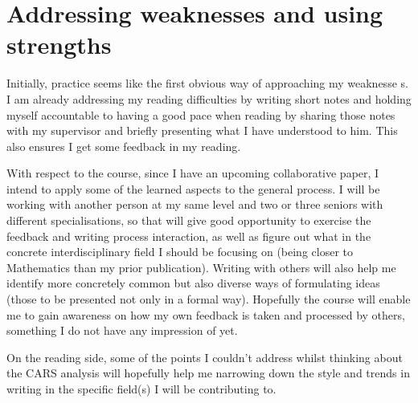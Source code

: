 
\section{Addressing weaknesses and using strengths}
\label{sec:addressing}

Initially, practice seems like the first obvious way of approaching my weaknesse
s.
 I am already addressing my reading difficulties by writing short notes
 and holding myself accountable to having a good pace when reading by sharing
 those notes with my supervisor and briefly presenting what I have understood
 to him.
 This also ensures I get some feedback in my reading.

With respect to the course, since I have an upcoming collaborative paper,
 I intend to apply some of the learned aspects to the general process.
 I will be working with another person at my same level and two or three
 seniors with different specialisations, so that will give good opportunity
 to exercise the feedback and writing process interaction, as well as figure
 out what in the concrete interdisciplinary field I should be focusing on
 (being closer to Mathematics than my prior publication).
 Writing with others will also help me identify more concretely common but
 also diverse ways of formulating ideas (those to be presented not only
 in a formal way).
 Hopefully the course will enable me to gain awareness on how my own feedback
 is taken and processed by others, something I do not have any impression
 of yet.

On the reading side, some of the points I couldn't address whilst thinking
 about the CARS analysis will hopefully help me narrowing down the style
 and trends in writing in the specific field(s) I will be contributing to.


